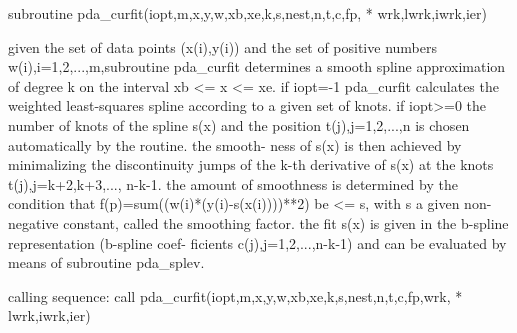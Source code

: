 \documentclass[11pt,twoside,nolof]{starlink}
\begin{document}
\begin{terminalv}
      subroutine pda_curfit(iopt,m,x,y,w,xb,xe,k,s,nest,n,t,c,fp,
     * wrk,lwrk,iwrk,ier)


  given the set of data points (x(i),y(i)) and the set of positive
  numbers w(i),i=1,2,...,m,subroutine pda_curfit determines a smooth spline
  approximation of degree k on the interval xb <= x <= xe.
  if iopt=-1 pda_curfit calculates the weighted least-squares spline
  according to a given set of knots.
  if iopt>=0 the number of knots of the spline s(x) and the position
  t(j),j=1,2,...,n is chosen automatically by the routine. the smooth-
  ness of s(x) is then achieved by minimalizing the discontinuity
  jumps of the k-th derivative of s(x) at the knots t(j),j=k+2,k+3,...,
  n-k-1. the amount of smoothness is determined by the condition that
  f(p)=sum((w(i)*(y(i)-s(x(i))))**2) be <= s, with s a given non-
  negative constant, called the smoothing factor.
  the fit s(x) is given in the b-spline representation (b-spline coef-
  ficients c(j),j=1,2,...,n-k-1) and can be evaluated by means of
  subroutine pda_splev.

  calling sequence:
     call pda_curfit(iopt,m,x,y,w,xb,xe,k,s,nest,n,t,c,fp,wrk,
    * lwrk,iwrk,ier)


\end{terminalv}
\end{document}
